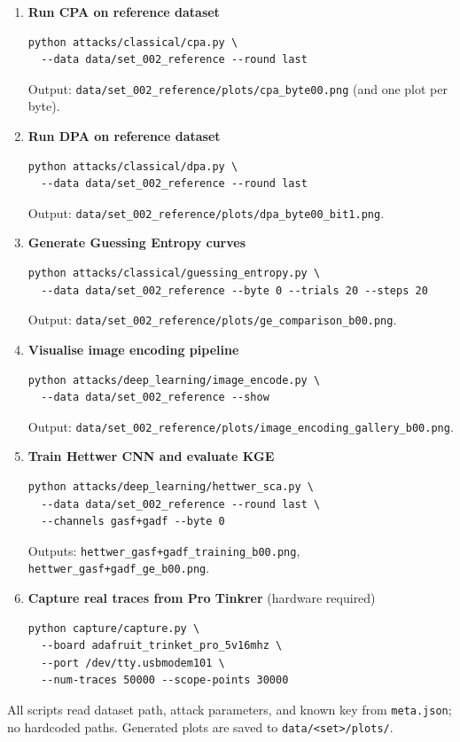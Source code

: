 \begin{enumerate}
  \item \textbf{Run CPA on reference dataset}
\begin{verbatim}
python attacks/classical/cpa.py \
  --data data/set_002_reference --round last
\end{verbatim}
  Output: \texttt{data/set\_002\_reference/plots/cpa\_byte00.png}
  (and one plot per byte).

  \item \textbf{Run DPA on reference dataset}
\begin{verbatim}
python attacks/classical/dpa.py \
  --data data/set_002_reference --round last
\end{verbatim}
  Output: \texttt{data/set\_002\_reference/plots/dpa\_byte00\_bit1.png}.

  \item \textbf{Generate Guessing Entropy curves}
\begin{verbatim}
python attacks/classical/guessing_entropy.py \
  --data data/set_002_reference --byte 0 --trials 20 --steps 20
\end{verbatim}
  Output: \texttt{data/set\_002\_reference/plots/ge\_comparison\_b00.png}.

  \item \textbf{Visualise image encoding pipeline}
\begin{verbatim}
python attacks/deep_learning/image_encode.py \
  --data data/set_002_reference --show
\end{verbatim}
  Output: \texttt{data/set\_002\_reference/plots/image\_encoding\_gallery\_b00.png}.

  \item \textbf{Train Hettwer CNN and evaluate KGE}
\begin{verbatim}
python attacks/deep_learning/hettwer_sca.py \
  --data data/set_002_reference --round last \
  --channels gasf+gadf --byte 0
\end{verbatim}
  Outputs: \texttt{hettwer\_gasf+gadf\_training\_b00.png},
           \texttt{hettwer\_gasf+gadf\_ge\_b00.png}.

  \item \textbf{Capture real traces from Pro Tinkrer } (hardware required)
\begin{verbatim}
python capture/capture.py \
  --board adafruit_trinket_pro_5v16mhz \
  --port /dev/tty.usbmodem101 \
  --num-traces 50000 --scope-points 30000
\end{verbatim}
\end{enumerate}

\noindent
All scripts read dataset path, attack parameters, and known key from
\texttt{meta.json}; no hardcoded paths.
Generated plots are saved to \texttt{data/<set>/plots/}.
